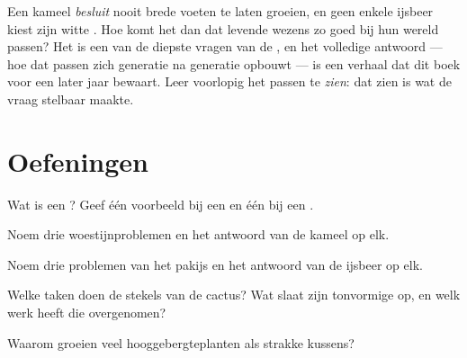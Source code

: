 \begin{remark}\label{rem:g4:adapted-to-their-world:how}
Een kameel \emph{besluit} nooit brede voeten te laten groeien, en geen
enkele ijsbeer kiest zijn witte . Hoe komt het dan dat levende
wezens zo goed bij hun wereld passen? Het is een van de diepste vragen
van de , en het volledige antwoord --- hoe dat passen zich
generatie na generatie opbouwt --- is een verhaal dat dit boek voor een
later jaar bewaart. Leer voorlopig het passen te \emph{zien}: dat zien
is wat de vraag stelbaar maakte.
\end{remark}

\section{Oefeningen}

\begin{exercise}[$\star$]\label{exo:g4:adapted-to-their-world:1}
Wat is een ? Geef één voorbeeld bij een  en één bij een .
\end{exercise}

\begin{exercise}[$\star$]\label{exo:g4:adapted-to-their-world:2}
Noem drie woestijnproblemen en het antwoord van de kameel op elk.
\end{exercise}

\begin{exercise}[$\star$]\label{exo:g4:adapted-to-their-world:3}
Noem drie problemen van het pakijs en het antwoord van de ijsbeer op elk.
\end{exercise}

\begin{exercise}[$\star$]\label{exo:g4:adapted-to-their-world:4}
Welke taken doen de stekels van de cactus? Wat slaat zijn tonvormige
 op, en welk werk heeft die  overgenomen?
\end{exercise}

\begin{exercise}[$\star$]\label{exo:g4:adapted-to-their-world:5}
Waarom groeien veel hooggebergteplanten als strakke kussens?
\end{exercise}

